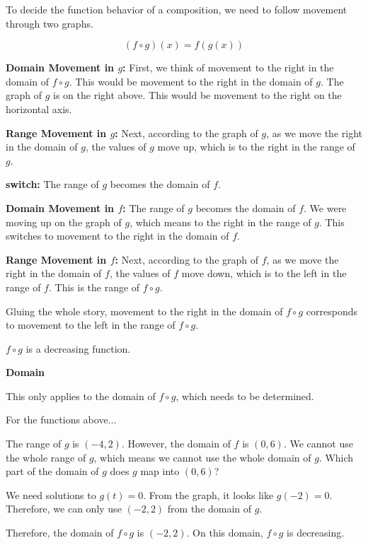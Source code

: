 \documentclass{ximera}
\begin{document}
To decide the function behavior of a composition, we need to follow movement through two graphs. 



\[
(f \circ g)(x) = f(g(x))
\]



\textbf{\textcolor{blue!55!black}{Domain Movement in $g$:}}  First, we think of movement to the right in the domain of $f \circ g$.  This would be movement to the right in the domain of $g$.  The graph of $g$ is on the right above.  This would be movement to the right on the horizontal axis.



\textbf{\textcolor{blue!55!black}{Range Movement in $g$:}}  Next, according to the graph of $g$, as we move the right in the domain of $g$, the values of $g$ move up, which is to the right in the range of $g$.




\textbf{\textcolor{blue!55!black}{switch:}}   The range of $g$ becomes the domain of $f$.  


\textbf{\textcolor{blue!55!black}{Domain Movement in $f$:}}   The range of $g$ becomes the domain of $f$.  We were moving up on the graph of $g$, which means to the right in the range of $g$.  This switches to movement to the right in the domain of $f$.


\textbf{\textcolor{blue!55!black}{Range Movement in $f$:}}  Next, according to the graph of $f$, as we move the right in the domain of $f$, the values of $f$ move down, which is to the left in the range of $f$.  This is the range of $f \circ g$.




Gluing the whole story, movement to the right in the domain of $f \circ g$ corresponds to movement to the left in the range of $f \circ g$.

$f \circ g$ is a decreasing function.



\begin{observation} \textbf{\textcolor{-red!75}{Domain}}


This only applies to the domain of $f \circ g$, which needs to be determined. 


For the functions above...


The range of $g$ is $(-4, 2)$.  However, the domain of $f$ is $(0, 6)$.   We cannot use the whole range of $g$, which means we cannot use the whole domain of $g$.  Which part of the domain of $g$ does $g$ map into $(0, 6)$? 


We need solutions to $g(t) = 0$.  From the graph, it looks like $g(-2) = 0$.  Therefore, we can only use $(-2, 2)$ from the domain of $g$.


Therefore, the domain of $f \circ g$ is $(-2, 2)$.  On this domain, $f \circ g$ is decreasing.



\end{observation}
\end{document}
